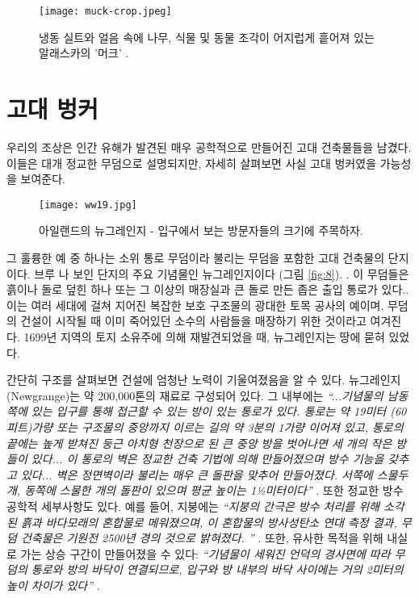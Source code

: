 \documentclass[10pt,twocolumn,letterpaper]{article}
\begin{document}
\begin{figure}[b]
\begin{center}
   \texttt{[image: muck-crop.jpeg]}
\end{center}
   \caption{ 냉동 실트와 얼음 속에 나무, 식물 및 동물 조각이 어지럽게 흩어져 있는 알래스카의 '머크' \cite{146}.}
\label{fig:7}
\label{fig:onecol}
\end{figure}

\section{고대 벙커}

우리의 조상은 인간 유해가 발견된 매우 공학적으로 만들어진 고대 건축물들을 남겼다. 이들은 대개 정교한 무덤으로 설명되지만, 자세히 살펴보면 사실 고대 벙커였을 가능성을 보여준다.

\begin{figure}[b]
\begin{center}
   \texttt{[image: ww19.jpg]}
\end{center}
   \caption{아일랜드의 뉴그레인지 - 입구에서 보는 방문자들의 크기에 주목하자.}
\label{fig:8}
\label{fig:onecol}
\end{figure}

그 훌륭한 예 중 하나는 소위 통로 무덤이라 불리는 무덤을 포함한 고대 건축물의 단지이다. 브루 나 보인 단지의 주요 기념물인 뉴그레인지이다 (그림 \ref{fig:8}). . 이 무덤들은 흙이나 돌로 덮힌 하나 또는 그 이상의 매장실과  큰 돌로 만든 좁은 출입 통로가 있다.\cite{70}. 이는 여러 세대에 걸쳐 지어진 복잡한 보호 구조물의 광대한 토목 공사의 예이며, 무덤의 건설이 시작될 때 이미 죽어있던 소수의 사람들을 매장하기 위한 것이라고 여겨진다. 1699년 지역의 토지 소유주에 의해 재발견되었을 때, 뉴그레인지는 땅에 묻혀 있었다.

간단히 구조를 살펴보면 건설에 엄청난 노력이 기울여졌음을 알 수 있다. 뉴그레인지(Newgrange)는 약 200,000톤의 재료로 구성되어 있다. 그 내부에는 \textit{“...기념물의 남동쪽에 있는 입구를 통해 접근할 수 있는 방이 있는 통로가 있다. 통로는 약 19미터 (60피트)가량 또는 구조물의 중앙까지 이르는 길의 약 3분의 1가량 이어져 있고, 통로의 끝에는 높게 받쳐진 둥근 아치형 천장으로 된 큰 중앙 방을 벗어나면 세 개의 작은 방들이 있다... 이 통로의 벽은 정교한 건축 기법에 의해 만들어졌으며 방수 기능을 갖추고 있다... 벽은 정면벽이라 불리는 매우 큰 돌판을 맞추어 만들어졌다. 서쪽에 스물두 개, 동쪽에 스물한 개의 돌판이 있으며 평균 높이는 1½미터이다”} \cite{70}. 또한 정교한 방수 공학적 세부사항도 있다. 예를 들어, 지붕에는 \textit{“지붕의 간극은 방수 처리를 위해 소각된 흙과 바다모래의 혼합물로 메워졌으며, 이 혼합물의 방사성탄소 연대 측정 결과, 무덤 건축물은 기원전 2500년 경의 것으로 밝혀졌다. ”} \cite{71}. 또한, 유사한 목적을 위해 내실로 가는 상승 구간이 만들어졌을 수 있다: \textit{“기념물이 세워진 언덕의 경사면에 따라 무덤의 통로와 방의 바닥이 연결되므로, 입구와 방 내부의 바닥 사이에는 거의 2미터의 높이 차이가 있다”} \cite{71}.
\end{document}
